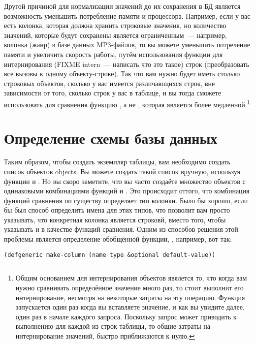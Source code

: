 Другой причиной для нормализации значений до их сохранения в БД является возможность
уменьшить потребление памяти и процессора.  Например, если у вас есть колонка, которая
должна хранить строковые значения, но количество значений, которые будут сохранены
является ограниченным~--- например, колонка  (жанр) в базе данных MP3-файлов,
то вы можете уменьшить потреление памяти и увеличить скорость работы, путём использования
функции  для интернирования (FIXME intern~--- написать что это
такое) строк (преобразовать все вызовы  к одному объекту-строке).  Так что
вам нужно будет иметь столько строковых объектов, сколько у вас имеется различающихся
строк, вне зависимости от того, сколько строк у вас в таблице, и вы тогда сможете
использовать для сравнения функцию , а не , которая является более
медленной.\footnote{Общим основанием для интернирования объектов явялется то, что когда
    вам нужно сравнивать определённое значение много раз, то стоит выполнит его
    интернирование, несмотря на некоторые затраты на эту операцию.
    Функция запускается один раз когда вы вставляете значение, и
    как вы увидите далее, один раз в начале каждого запроса. Поскольку запрос может
    приводить к выполнению  для каждой из строк таблицы, то общие
затраты на интернирование значений, быстро приближаются к нулю.}

\section{Определение схемы базы данных}

Таким образом, чтобы создать экземпляр таблицы, вам необходимо создать список объектов
 objects.  Вы можете создать такой список вручную, используя функции
 и .  Но вы скоро заметите, что вы часто создаёте множество
объектов  с одинаковыми комбинациями функций  и
. Это происходит оттого, что комбинация функций сравнения по
существу определяет тип колонки. Было бы хорошо, если бы был способ определить имена для
этих типов, что позволит вам просто указывать, что конкретная колонка является строковй,
вместо того, чтобы указывать  и  в качестве функций сравнения.
Одним из способов решения этой проблемы является определение обобщённой функции,
, например, вот так:

\begin{lstlisting}
(defgeneric make-column (name type &optional default-value))
\end{lstlisting}

